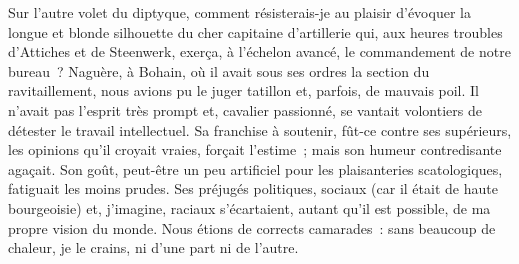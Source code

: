 \documentclass[french,twoside]{book} %
\begin{document}
Sur l’autre volet du diptyque, comment résisterais-je au plaisir d’évoquer la longue et blonde silhouette   du cher capitaine d’artillerie qui, aux heures troubles d’Attiches et de Steenwerk, exerça, à l’échelon avancé, le commandement de notre bureau ? Naguère, à Bohain, où il avait sous ses ordres la section du ravitaillement, nous avions pu le juger tatillon et, parfois, de mauvais poil. Il n’avait pas l’esprit très prompt et, cavalier passionné, se vantait volontiers de détester le travail intellectuel. Sa franchise à soutenir, fût-ce contre ses supérieurs, les opinions qu’il croyait vraies, forçait l’estime ; mais son humeur contredisante agaçait. Son goût, peut-être un peu artificiel pour les plaisanteries scatologiques, fatiguait les moins prudes. Ses préjugés politiques, sociaux (car il était de haute bourgeoisie) et, j’imagine, raciaux s’écartaient, autant qu’il est possible, de ma propre vision du monde. Nous étions de corrects camarades : sans beaucoup de chaleur, je le crains, ni d’une part ni de l’autre.\par
\end{document}
